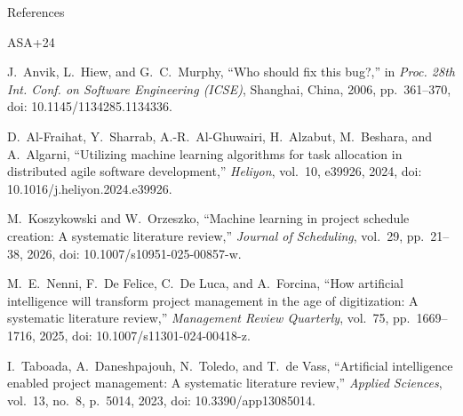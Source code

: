 \documentclass[10pt, a4paper]{beamer}
\begin{document}
	
	\begin{frame}[allowframebreaks]{References}
		\scriptsize
		\begin{thebibliography}{ASA+24}
			
			J.~Anvik, L.~Hiew, and G.~C.~Murphy,
			``Who should fix this bug?,''
			in \emph{Proc. 28th Int. Conf. on Software Engineering (ICSE)}, Shanghai, China, 2006, pp.~361--370,
			doi: 10.1145/1134285.1134336.
			
			D.~Al-Fraihat, Y.~Sharrab, A.-R.~Al-Ghuwairi, H.~Alzabut, M.~Beshara, and A.~Algarni,
			``Utilizing machine learning algorithms for task allocation in distributed agile software development,''
			\emph{Heliyon}, vol.~10, e39926, 2024,
			doi: 10.1016/j.heliyon.2024.e39926.
			
			M.~Koszykowski and W.~Orzeszko,
			``Machine learning in project schedule creation: A systematic literature review,''
			\emph{Journal of Scheduling}, vol.~29, pp.~21--38, 2026,
			doi: 10.1007/s10951-025-00857-w.
			
			M.~E.~Nenni, F.~De Felice, C.~De Luca, and A.~Forcina,
			``How artificial intelligence will transform project management in the age of digitization: A systematic literature review,''
			\emph{Management Review Quarterly}, vol.~75, pp.~1669--1716, 2025,
			doi: 10.1007/s11301-024-00418-z.
			
			I.~Taboada, A.~Daneshpajouh, N.~Toledo, and T.~de Vass,
			``Artificial intelligence enabled project management: A systematic literature review,''
			\emph{Applied Sciences}, vol.~13, no.~8, p.~5014, 2023,
			doi: 10.3390/app13085014.
			
		\end{thebibliography}
	\end{frame}
	
\end{document}
